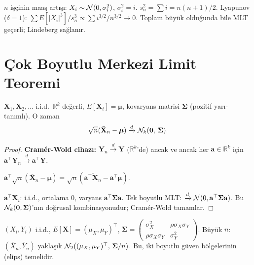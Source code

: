 \begin{ornek}
$n$ işçinin maaş artışı: $X_i \sim \mathcal{N}(0, \sigma_i^2)$, $\sigma_i^2 = i$.
$s_n^2 = \sum i = n(n+1)/2$.
Lyapunov ($\delta=1$): $\sum E[|X_i|^3]/s_n^3 \propto \sum i^{3/2}/n^{3/2} \to 0$.
Toplam büyük olduğunda bile MLT geçerli; Lindeberg sağlanır.
\end{ornek}

\section{Çok Boyutlu Merkezi Limit Teoremi}
\label{sec:cok_boyut_mlt}

\begin{teorem}
\label{thm:cok_boyut_mlt}
$\mathbf{X}_1, \mathbf{X}_2, \ldots$ i.i.d.\ $\mathbb{R}^k$ değerli,
$E[\mathbf{X}_i] = \boldsymbol{\mu}$, kovaryans matrisi $\boldsymbol{\Sigma}$ (pozitif yarı-tanımlı). O zaman
\[
  \sqrt{n}(\bar{\mathbf{X}}_n - \boldsymbol{\mu}) \xrightarrow{d} \mathcal{N}_k(\mathbf{0},\, \boldsymbol{\Sigma}).
\]
\end{teorem}

\begin{proof}
\textbf{Cramér-Wold cihazı:} $\mathbf{Y}_n \xrightarrow{d} \mathbf{Y}$ ($\mathbb{R}^k$'de) ancak ve ancak
her $\mathbf{a} \in \mathbb{R}^k$ için $\mathbf{a}^\top \mathbf{Y}_n \xrightarrow{d} \mathbf{a}^\top \mathbf{Y}$.

$\mathbf{a}^\top \sqrt{n}(\bar{\mathbf{X}}_n - \boldsymbol{\mu}) = \sqrt{n}(\overline{\mathbf{a}^\top\mathbf{X}_n} - \mathbf{a}^\top\boldsymbol{\mu})$.

$\mathbf{a}^\top\mathbf{X}_i$: i.i.d., ortalama $0$, varyans $\mathbf{a}^\top\boldsymbol{\Sigma}\mathbf{a}$.
Tek boyutlu MLT: $\xrightarrow{d} \mathcal{N}(0, \mathbf{a}^\top\boldsymbol{\Sigma}\mathbf{a})$.
Bu $\mathcal{N}_k(\mathbf{0},\boldsymbol{\Sigma})$'nın doğrusal kombinasyonudur; Cramér-Wold tamamlar.
\end{proof}

\begin{ornek}
$(X_i, Y_i)$ i.i.d., $E[\mathbf{X}] = (\mu_X, \mu_Y)^\top$,
$\boldsymbol{\Sigma} = \begin{pmatrix}\sigma_X^2 & \rho\sigma_X\sigma_Y \\ \rho\sigma_X\sigma_Y & \sigma_Y^2\end{pmatrix}$.
Büyük $n$: $(\bar{X}_n, \bar{Y}_n)$ yaklaşık $\mathcal{N}_2\!\left((\mu_X,\mu_Y)^\top,\, \boldsymbol{\Sigma}/n\right)$.
Bu, iki boyutlu güven bölgelerinin (elips) temelidir.
\end{ornek}

